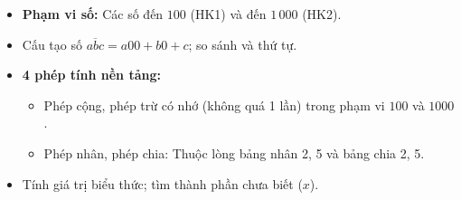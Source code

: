 \documentclass[10pt,a4paper]{article}
\begin{document}
\noindent
\begin{minipage}[t]{0.49\textwidth}\vspace{0pt}
\begin{tcolorbox}[
  enhanced,
  colback=violet!4!white,
  colframe=violet!75!black,
  arc=2mm, boxrule=0.8pt,
  left=2mm, right=2mm, top=1.8mm, bottom=1.8mm,
  title={\footnotesize\bfseries\color{white}\faKey\ 1. Trụ cột 1: Số học và Phép tính}
]
{\footnotesize
\begin{itemize}\setlength{\itemsep}{1pt}\setlength{\leftskip}{-2.5mm}
  \item \textbf{Phạm vi số:} Các số đến $100$ (HK1) và đến $1\,000$ (HK2).
  \item Cấu tạo số $\overline{abc} = a00 + b0 + c$; so sánh và thứ tự.
  \item \textbf{4 phép tính nền tảng:}
  \begin{itemize}\setlength{\itemsep}{0.5pt}\setlength{\leftskip}{-2mm}
    \item Phép cộng, phép trừ có nhớ (không quá 1 lần) trong phạm vi $100$ và $1000$.
    \item Phép nhân, phép chia: Thuộc lòng bảng nhân 2, 5 và bảng chia 2, 5.
  \end{itemize}
  \item Tính giá trị biểu thức; tìm thành phần chưa biết ($x$).
\end{itemize}
}
\end{tcolorbox}
\end{minipage}
\hfill
\end{document}
